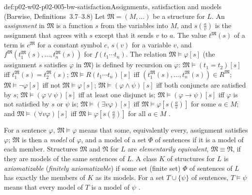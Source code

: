 \begin{hbdefinition}{def:p02-w02-p02-005-bw-satisfaction}{Assignments, satisfaction and models (Barwise, Definitions~3.7--3.8)}
Let \(\mathfrak M=(M,\ldots)\) be a structure for \(L\).  An
\emph{assignment} in \(\mathfrak M\) is a function \(s\) from the variables
into \(M\), and \(s(\tfrac{a}{v})\) is the assignment that agrees with
\(s\) except that it sends \(v\) to \(a\).  The value
\(t^{\mathfrak M}(s)\) of a term is \(c^{\mathfrak M}\) for a constant
symbol \(c\), \(s(v)\) for a variable \(v\), and
\(f^{\mathfrak M}(t_1^{\mathfrak M}(s),\ldots,t_n^{\mathfrak M}(s))\) for
\(f(t_1\cdots t_n)\).  The relation \(\mathfrak M\models\varphi[s]\)
(the assignment \(s\) satisfies \(\varphi\) in \(\mathfrak M\)) is defined
by recursion on \(\varphi\):
\(\mathfrak M\models(t_1=t_2)[s]\) iff
\(t_1^{\mathfrak M}(s)=t_2^{\mathfrak M}(s)\);
\(\mathfrak M\models R(t_1\cdots t_n)[s]\) iff
\((t_1^{\mathfrak M}(s),\ldots,t_n^{\mathfrak M}(s))\in R^{\mathfrak M}\);
\(\mathfrak M\models\neg\varphi[s]\) iff not
\(\mathfrak M\models\varphi[s]\);
\(\mathfrak M\models(\varphi\land\psi)[s]\) iff both conjuncts are
satisfied by \(s\);
\(\mathfrak M\models(\varphi\lor\psi)[s]\) iff at least one disjunct is;
\(\mathfrak M\models(\varphi\to\psi)[s]\) iff \(\varphi\) is not satisfied
by \(s\) or \(\psi\) is;
\(\mathfrak M\models(\exists v\varphi)[s]\) iff
\(\mathfrak M\models\varphi[s(\tfrac{a}{v})]\) for some \(a\in M\);
and \(\mathfrak M\models(\forall v\varphi)[s]\) iff
\(\mathfrak M\models\varphi[s(\tfrac{a}{v})]\) for all \(a\in M\)
\cite[ch.~A.1, \S3, Definitions~3.7--3.8, pp.~20--21]{Barwise1977FirstOrder}.

For a sentence \(\varphi\), \(\mathfrak M\models\varphi\) means that some,
equivalently every, assignment satisfies \(\varphi\); \(\mathfrak M\) is
then a \emph{model} of \(\varphi\), and a model of a set \(\Phi\) of
sentences if it is a model of each member.  Structures \(\mathfrak M\) and
\(\mathfrak N\) for \(L\) are \emph{elementarily equivalent},
\(\mathfrak M\equiv\mathfrak N\), if they are models of the same sentences
of \(L\).  A class \(K\) of structures for \(L\) is \emph{axiomatizable}
(\emph{finitely axiomatizable}) if some set (finite set) \(\Phi\) of
sentences of \(L\) has exactly the members of \(K\) as its models.
For a set \(T\cup\{\psi\}\) of sentences, \(T\models\psi\) means that every
model of \(T\) is a model of \(\psi\)
\cite[ch.~A.1, \S2, p.~10; \S3, pp.~21--22]{Barwise1977FirstOrder}.
\end{hbdefinition}


